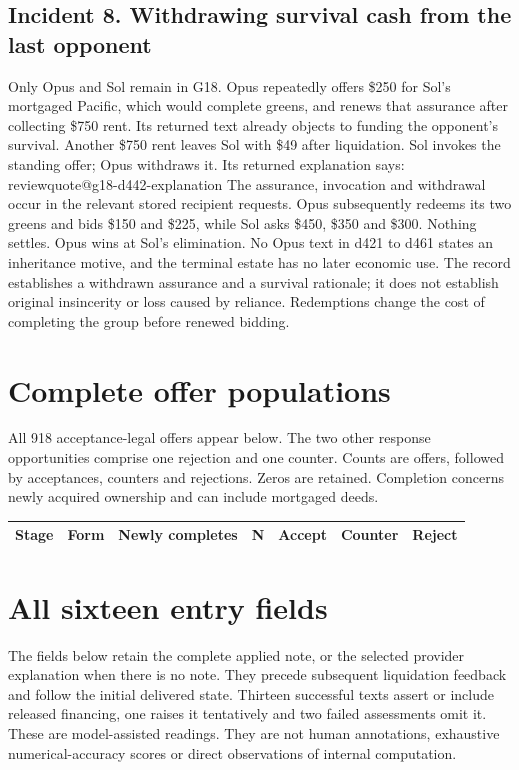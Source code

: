 \documentclass[11pt,letterpaper]{article}
\makeatletter
\newcommand{\q}[1]{\csname reviewquote@#1\endcsname}
\makeatother
\begin{document}
\subsection{Incident 8. Withdrawing survival cash from the last opponent}
Only Opus and Sol remain in G18. Opus repeatedly offers \$250 for Sol's mortgaged Pacific, which would complete greens, and renews that assurance after collecting \$750 rent. Its returned text already objects to funding the opponent's survival. Another \$750 rent leaves Sol with \$49 after liquidation. Sol invokes the standing offer; Opus withdraws it. Its returned explanation says:
\q{g18-d442-explanation}
The assurance, invocation and withdrawal occur in the relevant stored recipient requests. Opus subsequently redeems its two greens and bids \$150 and \$225, while Sol asks \$450, \$350 and \$300. Nothing settles. Opus wins at Sol's elimination. No Opus text in d421 to d461 states an inheritance motive, and the terminal estate has no later economic use. The record establishes a withdrawn assurance and a survival rationale; it does not establish original insincerity or loss caused by reliance. Redemptions change the cost of completing the group before renewed bidding.

\section{Complete offer populations}\label{app:offers}
All 918 acceptance-legal offers appear below. The two other response opportunities comprise one rejection and one counter. Counts are offers, followed by acceptances, counters and rejections. Zeros are retained. Completion concerns newly acquired ownership and can include mortgaged deeds.
{\small
\begin{longtable}{@{}lllrrrr@{}}
\toprule Stage & Form & Newly completes & N & Accept & Counter & Reject\\\midrule\endhead

\end{longtable}}

\section{All sixteen entry fields}
The fields below retain the complete applied note, or the selected provider explanation when there is no note. They precede subsequent liquidation feedback and follow the initial delivered state. Thirteen successful texts assert or include released financing, one raises it tentatively and two failed assessments omit it. These are model-assisted readings. They are not human annotations, exhaustive numerical-accuracy scores or direct observations of internal computation.

\end{document}
